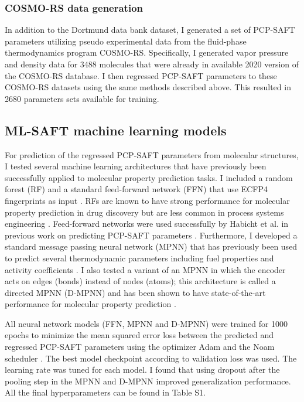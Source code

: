 \subsubsection{COSMO-RS data generation}

In addition to the Dortmund data bank dataset, I generated a set of PCP-SAFT parameters utilizing pseudo experimental data from the fluid-phase thermodynamics program COSMO-RS.\cite{Klamt2010} Specifically, I generated vapor pressure and density data for 3488 molecules that were already in available 2020 version of the COSMO-RS database. I then regressed PCP-SAFT parameters to these COSMO-RS datasets using the same methods described above. This resulted in 2680 parameters sets available for training.

\subsection{ML-SAFT machine learning models}\label{subsec:ML-SAFT_model}

For prediction of the regressed PCP-SAFT parameters from molecular structures, I tested several machine learning architectures that have previously been successfully applied to molecular property prediction tasks. I included a random forest (RF) \cite{Breiman2001} and a standard feed-forward network (FFN) that use ECFP4 fingerprints as input \cite{Rogers2010}. RFs are known to have strong performance for molecular property prediction in drug discovery but are less common in process systems engineering \cite{Ramsundar2017, Yang2019}. Feed-forward networks were used successfully by Habicht et al. in previous work on predicting PCP-SAFT parameters \cite{Habicht2023}. Furthermore, I developed a standard message passing neural network (MPNN) \cite{Gilmer2017} that has previously been used to predict several thermodynamic parameters including fuel properties \cite{Schweidtmann2020} and activity coefficients \cite{SanchezMedina2022, Rittig2023}. I also tested a variant of an MPNN in which the encoder acts on edges (bonds) instead of nodes (atoms); this architecture is called a directed MPNN (D-MPNN) and has been shown to have state-of-the-art performance for molecular property prediction \cite{Yang2019, Vermeire2021}.

All neural network models (FFN, MPNN and D-MPNN) were trained for 1000 epochs to minimize the mean squared error loss between the predicted and regressed PCP-SAFT parameters using the optimizer Adam \cite{Kingma2015} and the Noam scheduler \cite{Vaswani2017}. The best model checkpoint according to validation loss was used. The learning rate was tuned for each model. I found that using dropout after the pooling step in the MPNN and D-MPNN improved generalization performance. All the final hyperparameters can be found in Table S1.

